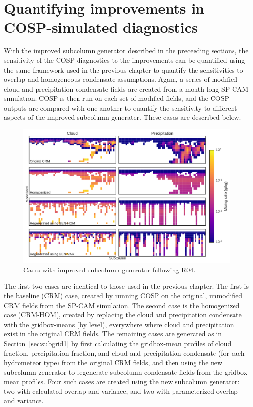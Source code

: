\section{Quantifying improvements in COSP-simulated
diagnostics}\label{sec:subgrid2ux5fresults}

With the improved subcolumn generator described in the preceeding
sections, the sensitivity of the COSP diagnostics to the improvements
can be quantified using the same framework used in the previous chapter
to quantify the sensitivities to overlap and homogeneous condensate
assumptions. Again, a series of modified cloud and precipitation
condensate fields are created from a month-long SP-CAM simulation. COSP
is then run on each set of modified fields, and the COSP outputs are
compared with one another to quantify the sensitivity to different
aspects of the improved subcolumn generator. These cases are described
below.

\begin{figure}[htbp]
\centering
\includegraphics{graphics/mxratio_gen-var.pdf}
\caption{\label{fig:mxratio_gen-var}Cases with improved subcolumn
generator following R04.}\label{fig:mxratioux5fgen-var}
\end{figure}

The first two cases are identical to those used in the previous chapter.
The first is the baseline (CRM) case, created by running COSP on the
original, unmodified CRM fields from the SP-CAM simulation. The second
case is the homogenized case (CRM-HOM), created by replacing the cloud
and precipitation condensate with the gridbox-means (by level),
everywhere where cloud and precipitation exist in the original CRM
fields. The remaining cases are generated as in
Section~\ref{sec:subgrid1} by first calculating the gridbox-mean
profiles of cloud fraction, precipitation fraction, and cloud and
precipitation condensate (for each hydrometeor type) from the original
CRM fields, and then using the new subcolumn generator to regenerate
subcolumn condensate fields from the gridbox-mean profiles. Four such
cases are created using the new subcolumn generator: two with calculated
overlap and variance, and two with parameterized overlap and variance.

